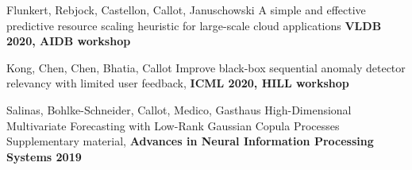 \documentclass[10pt]{article}
\newenvironment{innerlist}[1][\enskip\textbullet]%
        {\begin{compactitem}[#1]}{\end{compactitem}}
\begin{document}
\begin{innerlist}

\item[Flunkert, Rebjock, Castellon, Callot, Januschowski] {A simple and effective predictive resource scaling heuristic for large-scale cloud applications} \textbf{VLDB 2020, AIDB workshop}

\item[Kong, Chen, Chen, Bhatia, Callot] {
Improve black-box sequential anomaly detector relevancy with limited user feedback}, \textbf{ICML 2020, HILL workshop}

\item[Salinas, Bohlke-Schneider, Callot, Medico, Gasthaus] {High-Dimensional Multivariate Forecasting with Low-Rank Gaussian Copula Processes Supplementary material}, \textbf{Advances in Neural Information Processing Systems 2019}


\end{innerlist}
\end{document}
